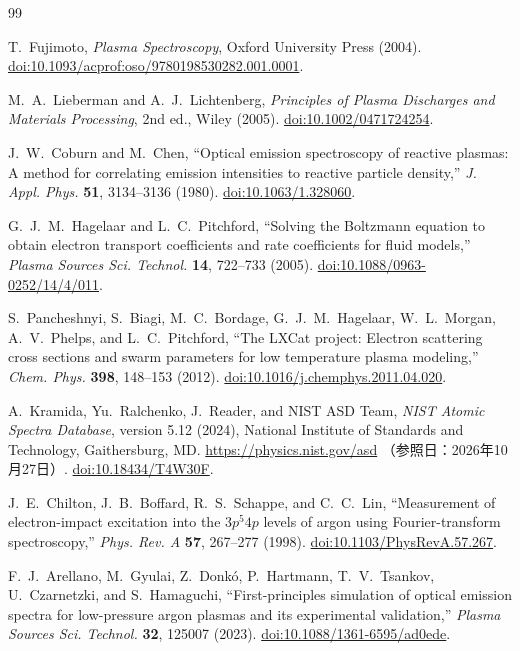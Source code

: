 \begingroup
\small\raggedright
\begin{thebibliography}{99}

T.~Fujimoto,
\textit{Plasma Spectroscopy},
Oxford University Press (2004).
\href{https://doi.org/10.1093/acprof:oso/9780198530282.001.0001}{doi:10.1093/acprof:oso/9780198530282.001.0001}.

M.~A.~Lieberman and A.~J.~Lichtenberg,
\textit{Principles of Plasma Discharges and Materials Processing},
2nd ed., Wiley (2005).
\href{https://doi.org/10.1002/0471724254}{doi:10.1002/0471724254}.

J.~W.~Coburn and M.~Chen,
``Optical emission spectroscopy of reactive plasmas: A method for correlating emission intensities to reactive particle density,''
\textit{J. Appl. Phys.} \textbf{51}, 3134--3136 (1980).
\href{https://doi.org/10.1063/1.328060}{doi:10.1063/1.328060}.

G.~J.~M.~Hagelaar and L.~C.~Pitchford,
``Solving the Boltzmann equation to obtain electron transport coefficients and rate coefficients for fluid models,''
\textit{Plasma Sources Sci. Technol.} \textbf{14}, 722--733 (2005).
\href{https://doi.org/10.1088/0963-0252/14/4/011}{doi:10.1088/0963-0252/14/4/011}.

S.~Pancheshnyi, S.~Biagi, M.~C.~Bordage, G.~J.~M.~Hagelaar,
W.~L.~Morgan, A.~V.~Phelps, and L.~C.~Pitchford,
``The LXCat project: Electron scattering cross sections and swarm parameters for low temperature plasma modeling,''
\textit{Chem. Phys.} \textbf{398}, 148--153 (2012).
\href{https://doi.org/10.1016/j.chemphys.2011.04.020}{doi:10.1016/j.chemphys.2011.04.020}.

A.~Kramida, Yu.~Ralchenko, J.~Reader, and NIST ASD Team,
\textit{NIST Atomic Spectra Database}, version 5.12 (2024),
National Institute of Standards and Technology, Gaithersburg, MD.
\href{https://physics.nist.gov/asd}{https://physics.nist.gov/asd}
（参照日：2026年10月27日）.
\href{https://doi.org/10.18434/T4W30F}{doi:10.18434/T4W30F}.

J.~E.~Chilton, J.~B.~Boffard, R.~S.~Schappe, and C.~C.~Lin,
``Measurement of electron-impact excitation into the $3p^{5}4p$ levels of argon using Fourier-transform spectroscopy,''
\textit{Phys. Rev. A} \textbf{57}, 267--277 (1998).
\href{https://doi.org/10.1103/PhysRevA.57.267}{doi:10.1103/PhysRevA.57.267}.

F.~J.~Arellano, M.~Gyulai, Z.~Donkó, P.~Hartmann,
T.~V.~Tsankov, U.~Czarnetzki, and S.~Hamaguchi,
``First-principles simulation of optical emission spectra for low-pressure argon plasmas and its experimental validation,''
\textit{Plasma Sources Sci. Technol.} \textbf{32}, 125007 (2023).
\href{https://doi.org/10.1088/1361-6595/ad0ede}{doi:10.1088/1361-6595/ad0ede}.


\end{thebibliography}
